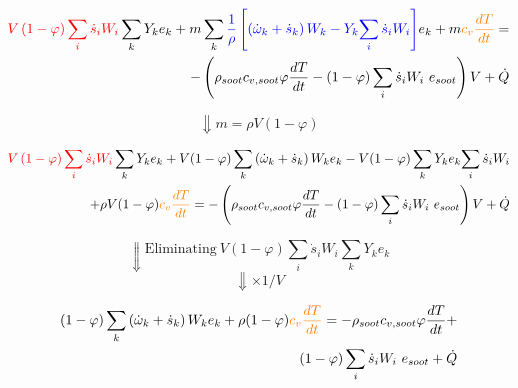 \begin{equation*}
	\begin{split}
	\color{red}
	V\left(1-\varphi\right)\sum_{i}{{\dot{s}}_iW_i}
	\color{black}
	\sum_{k}{Y_ke_k}
	+
	m
	\sum_{k}\color{blue}
	{
		\frac{1}{\rho}
		\left[
		\left({\dot{\omega}}_k+{\dot{s}}_k\right)W_k
		-Y_k{\sum_{i}{{\dot{s}}_iW_i}}
		\right]
	}
	\color{black}
	e_k
	+
	m	
	\color{orange}
	c_v
	\frac{dT}{dt}
	\color{black}
	= \\
	-\left(\rho_{soot}c_{v,soot}\varphi\frac{dT}{dt}-\left(1-\varphi\right)\sum_{i}{{\dot{s}}_iW_i}\ e_{soot}\right)V+\dot{Q}
	\end{split}
\end{equation*}

\begin{equation*}
	\Downarrow 
	m = \rho V (1-\varphi)
\end{equation*}


\begin{equation*}
	\begin{split}
		\color{red}
		V\left(1-\varphi\right)\sum_{i}{{\dot{s}}_iW_i}
		\color{black}
		\sum_{k}{Y_ke_k}
		+
		V (1-\varphi)
		\sum_{k}
		{
			\left({\dot{\omega}}_k+{\dot{s}}_k\right)W_k e_k
		}
		-
		V (1-\varphi)
		\sum_{k} Y_k e_k
		{\sum_{i}{{\dot{s}}_iW_i}}
		\color{black}
		\\
		+
		\rho V (1-\varphi)	
		\color{orange}
		c_v
		\frac{dT}{dt}
		\color{black}
		= 
		-\left(\rho_{soot}c_{v,soot}\varphi\frac{dT}{dt}-\left(1-\varphi\right)\sum_{i}{{\dot{s}}_iW_i}\ e_{soot}\right)V+\dot{Q}
	\end{split}
\end{equation*}

\begin{equation*}
	\Downarrow \mathrm{Eliminating\:}  
	V\left(1-\varphi\right)\sum_{i}{{\dot{s}}_iW_i}
	\sum_{k}{Y_ke_k}
\end{equation*}
\begin{equation*}
	\Downarrow \times 1/V
\end{equation*}

\begin{equation*}
	\begin{split}
		(1-\varphi)
		\sum_{k}
		{
			\left({\dot{\omega}}_k+{\dot{s}}_k\right)W_k e_k
		}
		+
		\rho (1-\varphi)	
		\color{orange}
		c_v
		\frac{dT}{dt}
		\color{black}
		=
		-\rho_{soot}c_{v,soot}\varphi\frac{dT}{dt}
		+\\
		\left(1-\varphi\right)\sum_{i}{{\dot{s}}_iW_i}\ e_{soot}+\dot{Q}
	\end{split}
\end{equation*}

